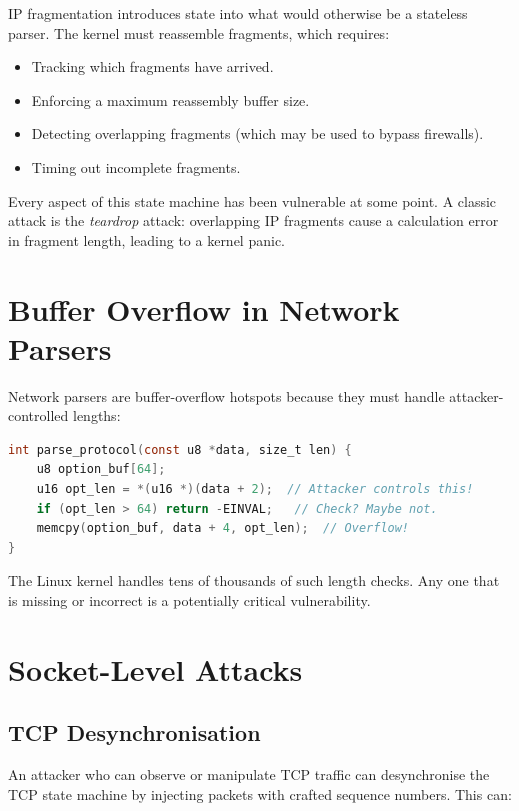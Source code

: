 IP fragmentation introduces state into what would otherwise be a stateless parser. The kernel must reassemble fragments, which requires:

\begin{itemize}
	\item Tracking which fragments have arrived.
	\item Enforcing a maximum reassembly buffer size.
	\item Detecting overlapping fragments (which may be used to bypass firewalls).
	\item Timing out incomplete fragments.
\end{itemize}

Every aspect of this state machine has been vulnerable at some point. A classic attack is the \emph{teardrop} attack: overlapping IP fragments cause a calculation error in fragment length, leading to a kernel panic.

\section{Buffer Overflow in Network Parsers}

Network parsers are buffer-overflow hotspots because they must handle attacker-controlled lengths:

\begin{lstlisting}[language=C, caption=Network buffer overflow pattern]
int parse_protocol(const u8 *data, size_t len) {
    u8 option_buf[64];
    u16 opt_len = *(u16 *)(data + 2);  // Attacker controls this!
    if (opt_len > 64) return -EINVAL;   // Check? Maybe not.
    memcpy(option_buf, data + 4, opt_len);  // Overflow!
}
\end{lstlisting}

The Linux kernel handles tens of thousands of such length checks. Any one that is missing or incorrect is a potentially critical vulnerability.

\section{Socket-Level Attacks}

\subsection{TCP Desynchronisation}

An attacker who can observe or manipulate TCP traffic can desynchronise the TCP state machine by injecting packets with crafted sequence numbers. This can:

